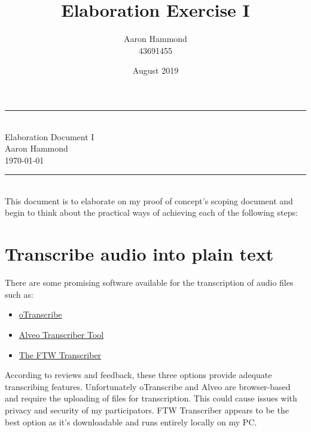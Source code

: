 \documentclass{article}
\title{Elaboration Exercise I}
\author{Aaron Hammond\\43691455}
\date{August 2019}
\newcommand\HRule{\rule{\textwidth}{1pt}} %
\begin{document}

\begin{titlepage}


\begin{center}
\HRule\\[0.4cm]
\huge{Elaboration Document I}\\[0.5cm]
\huge{Aaron Hammond}\\
\large{\today}\\[0.4cm]

\HRule \\[1cm]


\noindent This document is to elaborate on my proof of concept's scoping document and begin to think about the practical ways of achieving each  of the following steps:
\end{center}

\def\contentsname{\empty} %
\tableofcontents

\end{titlepage}


\section{Transcribe audio into plain text}
There are some promising software available for the transcription of audio files such as:
\begin{itemize}
    \item \hyperlink{https://otranscribe.com/}{oTranscribe}
    \item \hyperlink{https://alveo.github.io/alveo-transcriber/welcome}{Alveo Transcriber Tool}
    \item \hyperlink{https://www.theftwtranscriber.com/}{The FTW Transcriber}
\end{itemize}
According to reviews and feedback, these three options provide adequate transcribing features. Unfortunately oTranscribe and Alveo are browser-based and require the uploading of files for transcription. This could cause issues with privacy and security of my participators. FTW Transcriber appears to be the best option as it's downloadable and runs entirely locally on my PC.
\end{document}

